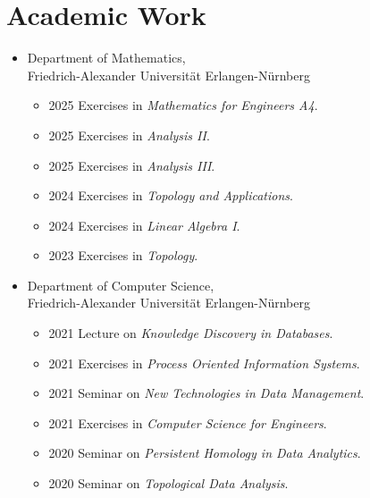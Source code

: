 \documentclass[a4paper, 11pt]{article}
\newcommand{\years}[1]{\marginnote{\scriptsize #1}}
\begin{document}
	\section*{Academic Work}
	\years{Teaching}
	\vspace{-2pt}
	\begin{itemize}[noitemsep, leftmargin=*]
		\item Department of Mathematics, \\ Friedrich-Alexander Universität Erlangen-Nürnberg
			\begin{itemize}
				\item 2025 Exercises in \emph{Mathematics for Engineers A4}.

				\item 2025 Exercises in \emph{Analysis II}.

				\item 2025 Exercises in \emph{Analysis III}.

				\item 2024 Exercises in \emph{Topology and Applications}.

				\item 2024 Exercises in \emph{Linear Algebra I}.

				\item 2023 Exercises in \emph{Topology}.
			\end{itemize}

		\item Department of Computer Science, \\ Friedrich-Alexander Universität
			Erlangen-Nürnberg
			\begin{itemize}
				\item 2021 Lecture on \emph{Knowledge Discovery in Databases}.

				\item 2021 Exercises in \emph{Process Oriented Information Systems}.

				\item 2021 Seminar on \emph{New Technologies in Data Management}.

				\item 2021 Exercises in \emph{Computer Science for Engineers}.

				\item 2020 Seminar on \emph{Persistent Homology in Data Analytics}.

				\item 2020 Seminar on \emph{Topological Data Analysis}.


\end{itemize}
\end{itemize}
\end{document}
